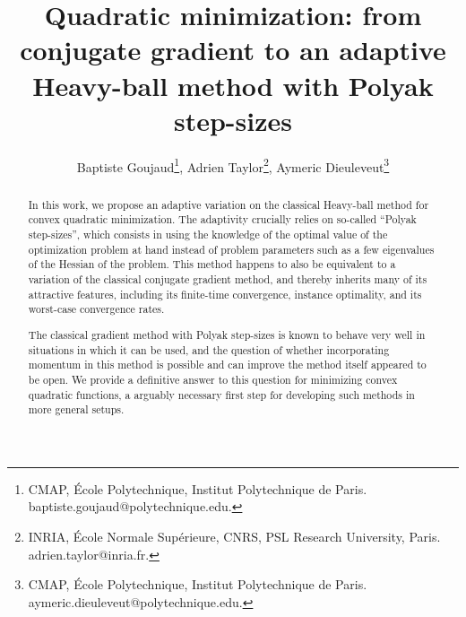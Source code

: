 \documentclass{article}
\title{Quadratic minimization: from conjugate gradient to an adaptive Heavy-ball method with Polyak step-sizes}
\author{
Baptiste Goujaud\footnote{CMAP, École Polytechnique, Institut Polytechnique de Paris.
baptiste.goujaud@polytechnique.edu.},
Adrien Taylor\footnote{INRIA, École Normale Supérieure, CNRS, PSL Research University, Paris.
adrien.taylor@inria.fr.},
Aymeric Dieuleveut\footnote{CMAP, École Polytechnique, Institut Polytechnique de Paris.
aymeric.dieuleveut@polytechnique.edu.}
}
\begin{document}
\maketitle

\begin{abstract}
    In this work, we propose an adaptive variation on the classical Heavy-ball method for convex quadratic minimization.
    The adaptivity crucially relies on so-called ``Polyak step-sizes'',
    which consists in using the knowledge of the optimal value of the optimization problem at hand
    instead of problem parameters such as a few eigenvalues of the Hessian of the problem.
    This method happens to  also be equivalent to a variation of the classical conjugate gradient method,
    and thereby inherits many of its attractive features, including its finite-time convergence,
    instance optimality, and its worst-case convergence rates.

    The classical gradient method with Polyak step-sizes is known to behave very well in situations in which it can be used,
    and the question of whether incorporating momentum in this method is possible and can improve the method itself appeared to be open.
    We provide a definitive answer to this question for minimizing convex quadratic functions,
    a arguably necessary first step for developing such methods in more general setups.
\end{abstract}
\end{document}
